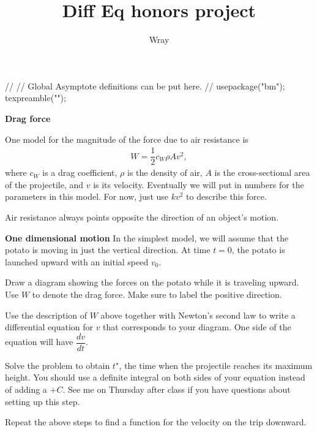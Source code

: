 \documentclass[addpoints, 12pt]{exam}
\title{Diff Eq honors project}
\author{Wray}
\begin{document}
\begin{asydef}
//
// Global Asymptote definitions can be put here.
//
usepackage("bm");
texpreamble("\def\V#1{\bm{#1}}");
\end{asydef}


\bigskip

\bigskip

\textbf{Drag force} \bigskip
\newline

One model for the magnitude of the force due to air resistance is
\begin{align*}
	W = \dfrac{1}{2} c_W \rho A v^2,
\end{align*}
where $c_W$ is a drag coefficient, $\rho$ is the density of air, $A$ is the 
cross-sectional area of the projectile, and $v$ is its velocity.  Eventually we will put
in numbers for the parameters in this model.  For now, just use $kv^2$ to describe this force. \bigskip

Air resistance always points opposite the direction of an object's motion.
\bigskip

\textbf{One dimensional motion} \bigskip
\newline
In the simplest model, we will assume that the potato is moving in just the vertical direction.  At time 
$t=0$, the potato is launched upward with an initial speed $v_0$.

\begin{questions}

\question
Draw a diagram showing the forces on the potato while it is traveling upward.  Use $W$ to denote the drag force.  Make sure to label the positive direction.

\question
Use the description of $W$ above together with Newton's second law to write a differential equation for $v$ that corresponds to your diagram.  One side of the equation will have $\dfrac{dv}{dt}$.

\question
Solve the problem to obtain $t^{\star}$, the time when the projectile reaches its maximum height.  You should use a definite integral on both sides of your equation instead of adding a 
$+C$.  See me on Thursday after class if you have questions about setting up this step.

\question
Repeat the above steps to find a function for the velocity on the trip downward.

\end{questions}
\end{document}

